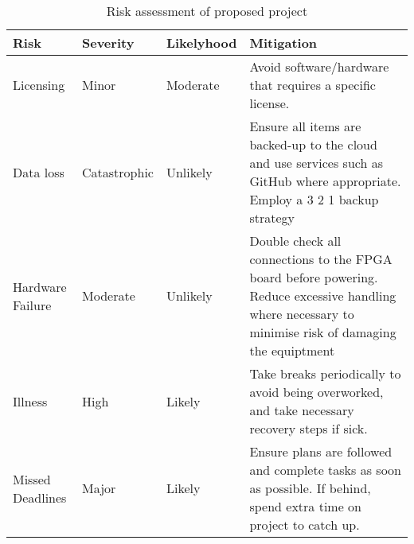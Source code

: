 \begin{table}[hbt!]
    \centering%
        \begin{tabularx}{\textwidth}{ lllX }
            \hline
            Risk       & Severity & Likelyhood & Mitigation  \\ \hline

            Licensing & Minor & Moderate & Avoid software/hardware that requires a specific license. \\
            Data loss & Catastrophic & Unlikely & Ensure all items are backed-up to the cloud and use services such as GitHub where appropriate. Employ a 3 2 1 backup strategy \\
            Hardware Failure & Moderate & Unlikely & Double check all connections to the FPGA board before powering. Reduce excessive handling where necessary to minimise risk of damaging the equiptment \\
            Illness & High & Likely & Take breaks periodically to avoid being overworked, and take necessary recovery steps if sick. \\
            Missed Deadlines & Major & Likely & Ensure plans are followed and complete tasks as soon as possible. If behind, spend extra time on project to catch up.\\
    
            \hline
            \end{tabularx}
    \caption{ Risk assessment of proposed project}\label{table:milestones}
    \end{table}
     
    